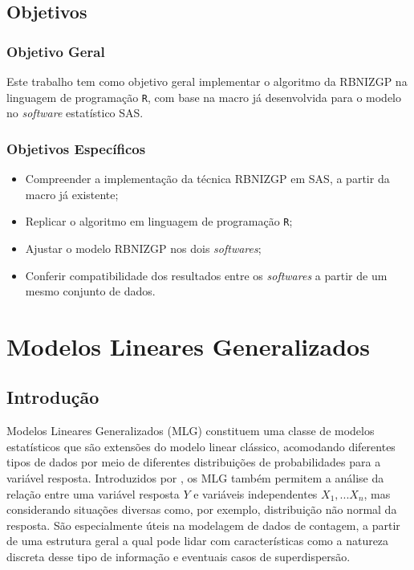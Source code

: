 \documentclass[12pt, a4paper, twoside]{report}
\numberwithin{equation}{section} %
\begin{document}
\section{Objetivos}
 \noindent

\subsection{Objetivo Geral}
 
Este trabalho tem como objetivo geral implementar o algoritmo da RBNIZGP na linguagem de programação \texttt{R}, com base na macro já desenvolvida para o modelo no \textit{software} estatístico SAS.

\subsection{Objetivos Específicos}
 
\begin{itemize}
    \item Compreender a implementação da técnica RBNIZGP em SAS, a partir da macro já existente;
    \item Replicar o algoritmo em linguagem de programação \texttt{R};
    \item Ajustar o modelo RBNIZGP nos dois \textit{softwares};
    \item Conferir compatibilidade dos resultados entre os \textit{softwares} a partir de um mesmo conjunto de dados.
\end{itemize}

\chapter{Modelos Lineares Generalizados}

\section{Introdução}
Modelos Lineares Generalizados (MLG) constituem uma classe de modelos estatísticos que são extensões do modelo linear clássico, acomodando diferentes tipos de dados por meio de diferentes distribuições de probabilidades para a variável resposta. Introduzidos por \cite{nelder1972generalized}, os MLG também permitem a análise da relação entre uma variável resposta $Y$ e variáveis independentes $X_{1},...X_{n}$, mas considerando situações diversas como, por exemplo, distribuição não normal da resposta. São especialmente úteis na modelagem de dados de contagem, a partir de uma estrutura geral a qual pode lidar com características como a natureza discreta desse tipo de informação e eventuais casos de superdispersão. 
\end{document}
